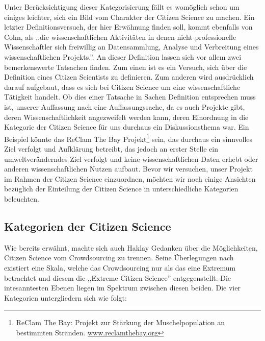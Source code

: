 \documentclass{article}
\begin{document}
Unter Berücksichtigung dieser Kategorisierung fällt es womöglich schon um einiges leichter, sich ein Bild vom Charakter der Citizen Science zu machen. Ein letzter Definitionsversuch, der hier Erwähnung finden soll, kommt ebenfalls von Cohn, als ,,die wissenschaftlichen Aktivitäten in denen nicht-professionelle Wissenschaftler sich freiwillig an Datensammlung, Analyse und Verbreitung eines wissenschaftlichen Projekts.''\cite{Cohn}. An dieser Definition lassen sich vor allem zwei bemerkenswerte Tatsachen finden. Zum einen ist es ein Versuch, sich über die Definition eines Citizen Scientists zu definieren. Zum anderen wird ausdrücklich darauf aufgebaut, dass es sich bei Citizen Science um eine wissenschaftliche Tätigkeit handelt. Ob dies einer Tatsache in Sachen Definition entsprechen muss ist, unserer Auffassung nach eine Auffassungssache, da es auch Projekte gibt, deren Wissenschaftlichkeit angezweifelt werden kann, deren Einordnung in die Kategorie der Citizen Science für uns durchaus ein Diskussionsthema war. Ein Beispiel könnte das ReClam The Bay Projekt\footnote{ReClam The Bay: Projekt zur Stärkung der Muschelpopulation an bestimmten Stränden. \url{www.reclamthebay.org}} sein, das durchaus ein sinnvolles Ziel verfolgt und Aufklärung betreibt, das jedoch an erster Stelle ein umweltveränderndes Ziel verfolgt und keine wissenschaftlichen Daten erhebt oder anderen wissenschaftlichen Nutzen aufbaut.
\newline
Bevor wir versuchen, unser Projekt im Rahmen der Citizen Science einzuordnen, möchten wir noch einige Ansichten bezüglich der Einteilung der Citizen Science in unterschiedliche Kategorien beleuchten.

\subsection{Kategorien der Citizen Science}
Wie bereits erwähnt, machte sich auch Haklay Gedanken über die Möglichkeiten, Citizen Science vom Crowdsourcing zu trennen. Seine Überlegungen nach existiert eine Skala, welche das Crowdsourcing nur als das eine Extremum betrachtet und diesem die ,,Extreme Citizen Science'' entgegenstellt. Die intesanntesten Ebenen liegen im Spektrum zwischen diesen beiden. Die vier Kategorien untergliedern sich wie folgt:
\end{document}
